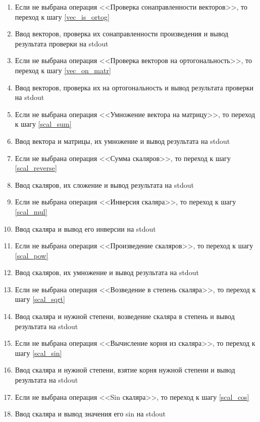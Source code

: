 \documentclass[a4paper,14pt]{extarticle}
\begin{document}
\begin{enumerate}
\item \label{vec_cocheck}
Если не выбрана операция <<Проверка сонаправленности векторов>>, 
то переход к шагу \ref{vec_is_ortog}
\item Ввод векторов, проверка их сонаправленности произведения 
и вывод результата проверки на stdout
	
\item \label{vec_is_ortog}
Если не выбрана операция <<Проверка векторов на ортогональность>>, 
то переход к шагу \ref{vec_on_matr}
\item Ввод векторов, проверка их на ортогональность
и вывод результата проверки на stdout
	
\item \label{vec_on_matr}
Если не выбрана операция <<Умножение вектора на матрицу>>, то переход к шагу \ref{scal_sum}
\item Ввод вектора и матрицы, их умножение и вывод результата на stdout
	
\item \label{scal_sum}
Если не выбрана операция <<Сумма скаляров>>, то переход к шагу \ref{scal_reverse} 
\item Ввод скаляров, их сложение и вывод результата на stdout
	
\item \label{scal_reverse}
Если не выбрана операция <<Инверсия скаляра>>, то переход к шагу \ref{scal_mul}
\item Ввод скаляра и вывод его инверсии на stdout
	
\item \label{scal_mul}
Если не выбрана операция <<Произведение скаляров>>, то переход к шагу \ref{scal_pow}
\item Ввод скаляров, их умножение и вывод результата на stdout	
	
\item \label{scal_pow}
Если не выбрана операция <<Возведение в степень скаляра>>, то переход к шагу \ref{scal_sqrt}
\item Ввод скаляра и нужной степени, возведение скаляра в степень
и вывод результата на stdout	
	
\item \label{scal_sqrt}
Если не выбрана операция <<Вычисление корня из скаляра>>, то переход к шагу \ref{scal_sin}
\item Ввод скаляра и нужной степени, взятие корня нужной степени
и вывод результата на stdout
	
\item \label{scal_sin}
Если не выбрана операция <<Sin скаляра>>, то переход к шагу \ref{scal_cos}
\item Ввод скаляра и вывод значения его sin на stdout
	

\end{enumerate}
\end{document}
